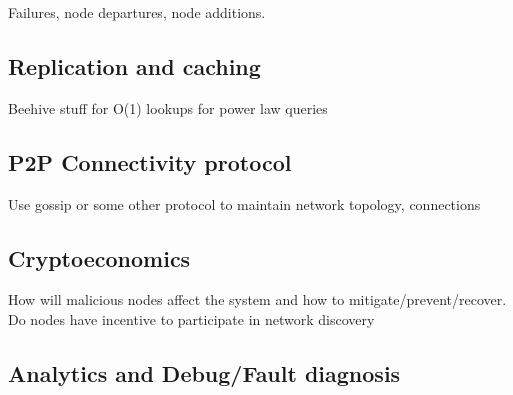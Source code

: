 Failures, node departures, node additions.

\subsection{Replication and caching}
Beehive stuff for O(1) lookups for power law queries

\subsection{P2P Connectivity protocol}
Use gossip or some other protocol to maintain network topology, connections

\subsection{Cryptoeconomics}
How will malicious nodes affect the system and how to mitigate/prevent/recover. Do nodes have incentive to participate in network discovery

\subsection{Analytics and Debug/Fault diagnosis}
